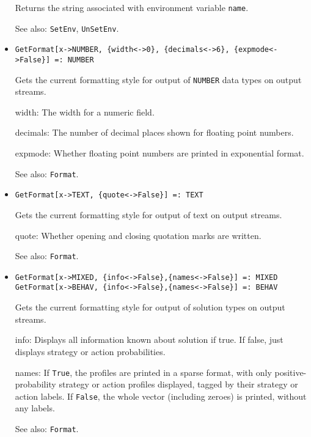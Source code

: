 \begin{itemize}
\bd
Returns the string associated with environment variable \verb+name+.
\item [See also:] \verb+SetEnv+, \verb+UnSetEnv+.
\ed


\item{}
\protect \large \begin{verbatim}
GetFormat[x->NUMBER, {width<->0}, {decimals<->6}, {expmode<->False}] =: NUMBER 
\end{verbatim} \normalsize

\bd Gets the current formatting style for output of {\tt NUMBER} data types
on output streams.  
\bd
\item [width:] The width for a numeric field.  
\item [decimals:] The number of decimal places shown for floating point
numbers.
\item [expmode:] Whether floating point numbers are printed in
exponential format.
\ed
\item [See also:] \verb+Format+.
\ed

\item{}
\protect \large \begin{verbatim}
GetFormat[x->TEXT, {quote<->False}] =: TEXT 
\end{verbatim} \normalsize

\bd
Gets the current formatting style for output of text on output streams.
\bd
\item [quote:] Whether opening and closing quotation marks are
written. 
\ed
\item [See also:] \verb+Format+.
\ed


\item{}
\protect \large \begin{verbatim}
GetFormat[x->MIXED, {info<->False},{names<->False}] =: MIXED
GetFormat[x->BEHAV, {info<->False},{names<->False}] =: BEHAV
\end{verbatim} \normalsize

\bd Gets the current formatting style for output of solution types on
output streams.  
\bd
\item [info:] Displays all information known about solution if true. If false, just displays strategy or action probabilities.  
\item [names:] If \verb+True+, the profiles are printed in a sparse format,
with only positive-probability strategy or action profiles displayed, tagged
by their strategy or action labels.  If \verb+False+, the whole vector
(including zeroes) is printed, without any labels.
\ed
\item [See also:] \verb+Format+.
\ed


\end{itemize}
